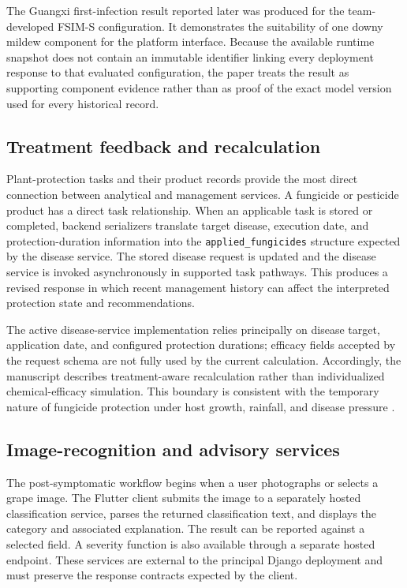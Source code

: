 \documentclass[12pt]{article}
\begin{document}
The Guangxi first-infection result reported later was produced for the team-developed FSIM-S configuration. It demonstrates the suitability of one downy mildew component for the platform interface. Because the available runtime snapshot does not contain an immutable identifier linking every deployment response to that evaluated configuration, the paper treats the result as supporting component evidence rather than as proof of the exact model version used for every historical record.

\subsection{Treatment feedback and recalculation}\label{treatment-feedback-and-recalculation}

Plant-protection tasks and their product records provide the most direct connection between analytical and management services. A fungicide or pesticide product has a direct task relationship. When an applicable task is stored or completed, backend serializers translate target disease, execution date, and protection-duration information into the \texttt{applied\_fungicides} structure expected by the disease service. The stored disease request is updated and the disease service is invoked asynchronously in supported task pathways. This produces a revised response in which recent management history can affect the interpreted protection state and recommendations.

The active disease-service implementation relies principally on disease target, application date, and configured protection durations; efficacy fields accepted by the request schema are not fully used by the current calculation. Accordingly, the manuscript describes treatment-aware recalculation rather than individualized chemical-efficacy simulation. This boundary is consistent with the temporary nature of fungicide protection under host growth, rainfall, and disease pressure \citep{caffiFungicideModelsAre2018,oliverFungicideUsePatterns2023,warnekeEffectFungicideMobility2020}.

\subsection{Image-recognition and advisory services}\label{image-recognition-and-advisory-services}

The post-symptomatic workflow begins when a user photographs or selects a grape image. The Flutter client submits the image to a separately hosted classification service, parses the returned classification text, and displays the category and associated explanation. The result can be reported against a selected field. A severity function is also available through a separate hosted endpoint. These services are external to the principal Django deployment and must preserve the response contracts expected by the client.
\end{document}
